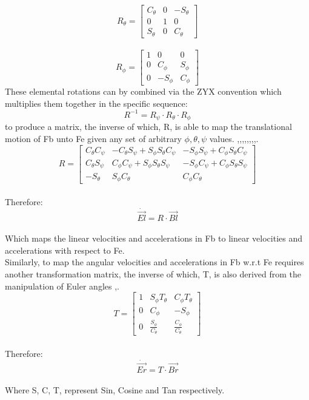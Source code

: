 \documentclass[12pt,a4paper,twoside]{report}
\begin{document}
			\\
			\begin{equation}
				R_\theta = 
				\begin{bmatrix}
					C_\theta & 0 & -S_\theta \\
					0 & 1 & 0 \\
					S_\theta & 0 & C_\theta
				\end{bmatrix}
			\end{equation}
			\\
			\begin{equation}
				R_\phi = 
				\begin{bmatrix}
					1 & 0 & 0 \\
					0 & C_\phi & S_\phi  \\
					0 & -S_\phi & C_\phi
				\end{bmatrix}
			\end{equation}
			\space
			These elemental rotations can by combined via the ZYX convention which multiplies them together in the specific sequence:
			\[R^{-1} = R_\psi \cdot R_\theta \cdot R_\phi\]
			to produce a matrix, the inverse of which, R, is able to map the translational motion of Fb unto Fe given any set of arbitrary \(\phi, \theta, \psi\) values. \cite{1},\cite{2},\cite{3},\cite{4},\cite{5},\cite{6},\cite{7},\cite{8},\cite{9}.
			\\
			\begin{equation}
				R = 
				\begin{bmatrix}
					C_\theta C_\psi & -C_\theta S_\psi + S_\phi S_\theta C_\psi & -S_\phi S_\psi + C_\phi S_\theta C_\psi \\
					C_\theta S_\psi &  C_\phi C_\psi + S_\phi S_\theta S_\psi   & -S_\phi C_\psi + C_\phi S_\theta S_\psi \\
					-S_\theta       &  S_\phi C_\theta                          &  C_\phi C_\theta
				\end{bmatrix}
			\end{equation}
			\\
			Therefore: 
			\[ \dot{\vec{El}} = R \cdot \vec{Bl} \]
			\\
			Which maps the linear velocities and accelerations in Fb to linear velocities and accelerations with respect to Fe.
			\\
			Similarly, to map the angular velocities and accelerations in Fb w.r.t Fe requires another transformation matrix, the inverse of which, T, is also derived from the manipulation of Euler angles \cite{1},\cite{4}. 
			\\
			\begin{equation}
				T = 
				\begin{bmatrix}
					1 & S_\phi T_\theta & C_\phi T_\theta \\
					0 & C_\phi & -S_\phi\\
					0 & \frac{S_\phi}{C_\theta}  & \frac{C_\phi}{C_\theta}
				\end{bmatrix}
			\end{equation} 
			\\
			Therefore:
			\\
			\[\dot{\vec{Er}} = T \cdot \vec{Br} \]
			\\
			Where S, C, T, represent Sin, Cosine and Tan respectively.
				
\end{document}
